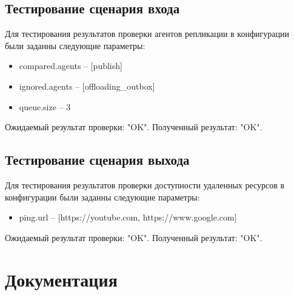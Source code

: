 \subsection{Тестирование сценария входа}
Для тестирования результатов проверки агентов репликации в конфигурации были заданны следующие параметры:
\begin{itemize}
\item compared.agents – [publish]
\item ignored.agents – [offloading\_outbox]
\item queue.size – 3
\end{itemize}

Ожидаемый результат проверки: "OK". Полученный результат: "OK".

\subsection{Тестирование сценария выхода}
Для тестирования результатов проверки доступности удаленных ресурсов в конфигурации были заданны следующие параметры:
\begin{itemize}
\item ping.url – [https://youtube.com, https://www.google.com]
\end{itemize}

Ожидаемый результат проверки: "OK". Полученный результат: "OK".

%
%

\section{Документация}

